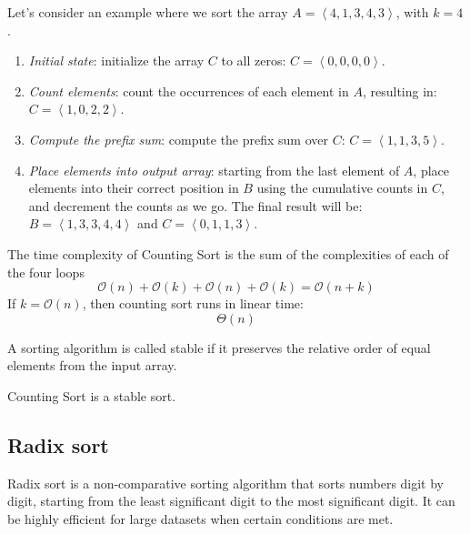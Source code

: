 \begin{example}
    Let's consider an example where we sort the array $A=\left\langle 4, 1, 3, 4, 3\right\rangle$, with $k=4$. 
    \begin{enumerate}
        \item \textit{Initial state}: initialize the array $C$ to all zeros: $C=\left\langle 0,0,0,0\right\rangle$.
        \item \textit{Count elements}: count the occurrences of each element in $A$, resulting in: $C=\left\langle 1,0,2,2\right\rangle$.
        \item \textit{Compute the prefix sum}: compute the prefix sum over $C$: $C=\left\langle 1,1,3,5\right\rangle$.
        \item \textit{Place elements into output array}: starting from the last element of $A$, place elements into their correct position in $B$ using the cumulative counts in $C$, and decrement the counts as we go. 
            The final result will be: $B=\left\langle 1,3,3,4,4\right\rangle$ and $C=\left\langle 0,1,1,3\right\rangle$.
    \end{enumerate}
\end{example}
The time complexity of Counting Sort is the sum of the complexities of each of the four loops
\[\mathcal{O}(n)+\mathcal{O}(k)+\mathcal{O}(n)+\mathcal{O}(k)=\mathcal{O}(n+k)\]
If $k = \mathcal{O}(n)$, then counting sort runs in linear time: 
\[\Theta(n)\]
\begin{definition}
    A sorting algorithm is called stable if it preserves the relative order of equal elements from the input array.
\end{definition}
\begin{property}
    Counting Sort is a stable sort.
\end{property}





























\subsection{Radix sort}
Radix sort is a non-comparative sorting algorithm that sorts numbers digit by digit, starting from the least significant digit to the most significant digit. 
It can be highly efficient for large datasets when certain conditions are met.

